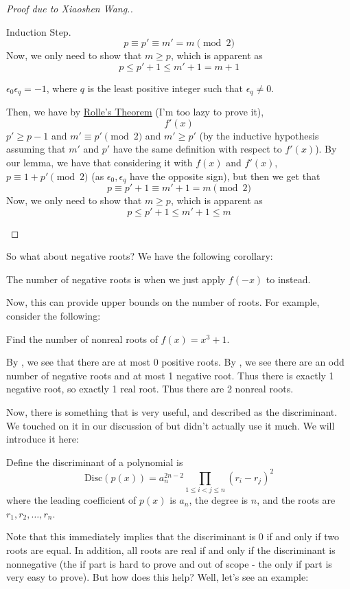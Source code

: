 \documentclass[11pt,titlepage]{scrartcl}
\begin{document}
\begin{proof}[Proof due to Xiaoshen Wang.]
\begin{induction_snippet}{Induction Step.}
\[p\equiv p'\equiv m'=m\pmod 2\]
Now, we only need to show that $m\geq p$, which is apparent as
\[p\leq p'+1\leq m'+1=m+1\]
\begin{altcase}
$\epsilon_0\epsilon_q=-1$, where $q$ is the least positive integer such that $\epsilon_q\neq 0$.
\end{altcase}
Then, we have by \href{https://en.wikipedia.org/wiki/Rolle's_theorem}{Rolle's Theorem} (I'm too lazy to prove it),
\[f'(x)\]
$p'\geq p-1$ and $m'\equiv p'\pmod 2$ and $m'\geq p'$ (by the inductive hypothesis assuming that $m'$ and $p'$ have the same definition with respect to $f'(x)$). By our lemma, we have that considering it with $f(x)$ and $f'(x)$, $p\equiv 1+p'\pmod 2$ (as $\epsilon_0,\epsilon_q$ have the opposite sign), but then we get that
\[p\equiv p'+1\equiv m'+1=m\pmod 2\]
Now, we only need to show that $m\geq p$, which is apparent as
\[p\leq p'+1\leq m'+1\leq m\]
\end{induction_snippet}
\end{proof}
So what about negative roots? We have the following corollary:
\begin{corollary}\label{drt}
The number of negative roots is when we just apply $f(-x)$ to  instead.
\end{corollary}
Now, this can provide upper bounds on the number of roots. For example, consider the following:
\begin{example}
Find the number of nonreal roots of $f(x)=x^3+1$.
\end{example}
\begin{soln}
By , we see that there are at most $0$ positive roots. By , we see there are an odd number of negative roots and at most 1 negative root. Thus there is exactly 1 negative root, so exactly 1 real root. Thus there are 2 nonreal roots.
\end{soln}
Now, there is something that is very useful, and described as the discriminant. We touched on it in our discussion of  but didn't actually use it much. We will introduce it here:
\begin{theorem}
Define the discriminant of a polynomial is
\[\text{Disc}(p(x))=a_n^{2n-2}\prod_{1\leq i<j\leq n}(r_i-r_j)^2\]
where the leading coefficient of $p(x)$ is $a_n$, the degree is $n$, and the roots are $r_1,r_2,\ldots,r_n$.
\end{theorem}
Note that this immediately implies that the discriminant is $0$ if and only if two roots are equal. In addition, all roots are real if and only if the discriminant is nonnegative (the if part is hard to prove and out of scope - the only if part is very easy to prove). But how does this help? Well, let's see an example:
\end{document}
